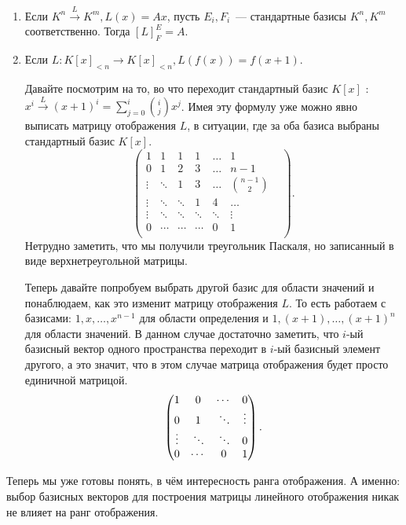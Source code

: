 \begin{examples}
    \begin{enumerate}
        \item
            Если $K^n\xrightarrow{L} K^m, L(x) = Ax$, пусть $E_i, F_i$~--- стандартные базисы $K^n, K^m$
            соответственно.
            Тогда $[L]^E_F = A$.
        \item
            Если $L: K[x]_{<n}\to K[x]_{<n}, L(f(x)) = f(x + 1)$.
            
            Давайте посмотрим на то, во что переходит стандартный базис $K[x]$ :
            $x^i\xrightarrow{L}(x+1)^i = \sum\limits_{j=0}^{i}{\binom{i}{j}x^j}$.
            Имея эту формулу уже можно явно выписать матрицу отображения $L$,
            в ситуации, где за оба базиса выбраны стандартный базис $K[x]$.
            \[
            \begin{pmatrix}
                1&1&1&1&\dots&1\\
                0&1&2&3&\dots&n-1\\
                \vdots&\ddots&1&3&\dots&\binom{n-1}{2}\\
                \vdots&\ddots&\ddots&1&4&\dots&\\
                \vdots&\ddots&\ddots&\ddots&\ddots&\vdots\\
                0&\cdots&\cdots&\cdots&0&1\\
            \end{pmatrix}
        .\] 
        Нетрудно заметить, что мы получили треугольник Паскаля, но записанный в виде 
        верхнетреугольной матрицы.

        Теперь давайте попробуем выбрать другой базис для области значений и понаблюдаем,
        как это изменит матрицу отображения $L$. То есть работаем с базисами:
        $1, x,\dots, x^{n-1}$ для области определения и $1,(x + 1), \dots, (x+1)^n$ для
        области значений.  В данном случае достаточно заметить, что $i$-ый базисный
        вектор одного пространства переходит в $i$-ый базисный элемент другого, а это
        значит, что в этом случае матрица отображения будет просто единичной матрицой.
        \[
        \begin{pmatrix}
            1&0&\cdots&0\\
            0&1&\rotatebox{140}{\ldots}&\vdots\\
            \vdots&\rotatebox{140}{\ldots}&\rotatebox{140}{\ldots}&0\\
            0&\cdots&0&1\\
        \end{pmatrix}
        .\] 
    \end{enumerate}
\end{examples}
\begin{motivation}
    Теперь мы уже готовы понять, в чём интересность ранга отображения.
    А именно: выбор базисных векторов для построения матрицы линейного отображения
    никак не влияет на ранг отображения.
\end{motivation}
